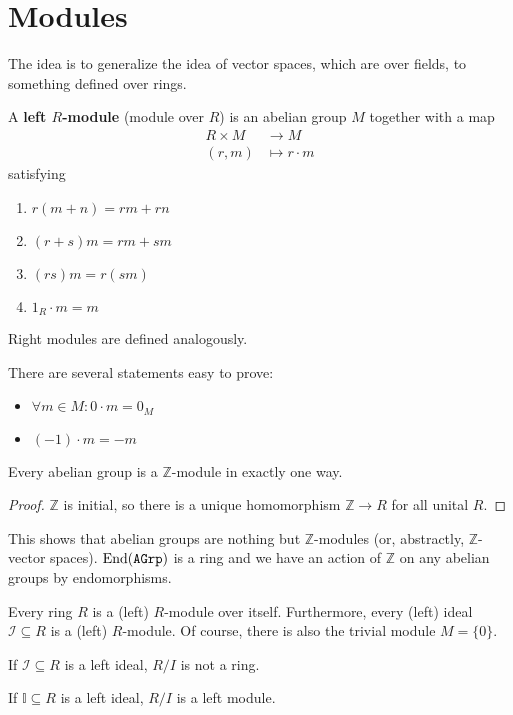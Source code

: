 \section{Modules}
The idea is to generalize the idea of vector spaces, which are over fields, to something defined over rings.
\begin{definition}[Module]
    A \textbf{left $R$-module} (module over $R$) is an abelian group $M$ together with a map 
    \begin{align*}
        R \times M &\to M \\
        (r,m) &\mapsto r \cdot m
\end{align*}
satisfying
\begin{enumerate}
    \item $r(m+n)=rm+rn$
    \item $(r+s)m=rm+sm$
    \item $(rs)m=r(sm)$
    \item $1_R \cdot m = m$
\end{enumerate}
Right modules are defined analogously.
\end{definition}
\begin{ex}
    There are several statements easy to prove:
    \begin{itemize}
        \item $\forall m \in M: 0 \cdot m = 0_M$    
        \item $(-1) \cdot m = -m$
    \end{itemize}
    
\end{ex}
\begin{theorem}
    Every abelian group is a $\mathbb{Z}$-module in exactly one way.
\end{theorem}
\begin{proof}
    $\mathbb{Z}$ is initial, so there is a unique homomorphism $\mathbb{Z} \to R$ for all unital $R$.
\end{proof}
This shows that abelian groups are nothing but $\mathbb{Z}$-modules (or, abstractly, $\mathbb{Z}$-vector spaces). $\operatorname{End}(\mathtt{AGrp})$ is a ring and we have an action of $\mathbb{Z}$ on any abelian groups by endomorphisms.
\begin{eg}
    Every ring $R$ is a (left) $R$-module over itself. Furthermore, every (left) ideal $\mathcal{I} \subseteq R$ is a (left) $R$-module.  Of course, there is also the trivial module $M=\{0\}$.
\end{eg}
If $\mathcal{I} \subseteq R$ is a left ideal, $R / I$ is not a ring.
\begin{ex}
   If $\mathbb{I} \subseteq R$ is a left ideal, $R / I$ is a left module. 
\end{ex}
